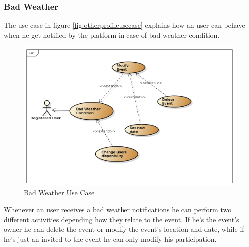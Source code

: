 \subsubsection{Bad Weather}
The use case in figure \ref{fig:otherprofileusecase} explains how an user can behave when he get notified by the platform in case of bad weather condition.
 \begin{center}
 \begin{figure}[H]
    \includegraphics[width=1.1\textwidth]{../UMLDiagram/use_case/BadWeather/BadWeather.png}
    \caption{Bad Weather Use Case}
     \label{fig:badweatherusecase}
     \end{figure}
   \end{center}  
Whenever an user receives a bad weather notifications he can perform two different activities depending how they relate to the event. If he's the event's owner he can delete the event or modify the event's location and date, while if he's just an invited to the event he can only modify his participation.

